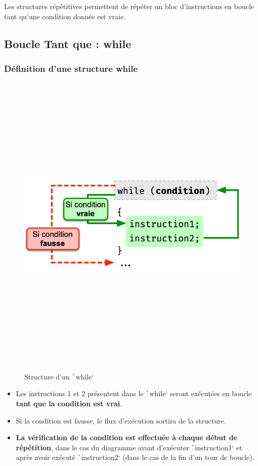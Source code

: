 \documentclass[10pt]{article}
\begin{document}
Les structures répétitives permettent de répéter un bloc d'instructions en boucle tant qu'une condition donnée est vraie.

\subsection{Boucle Tant que : while}
\subsubsection{Définition d'une structure while}

\smallskip
\begin{multicols}{2}
\begin{figure}[H]
    \includegraphics[max height=15cm,max width = \textwidth/2]{assets/while.jpg}
    \centering
    \caption{Structure d'un \texttt`while`}
\end{figure}

\begin{itemize}
    \item Les instructions 1 et 2 présentent dans le \texttt`while` seront exécutées en boucle \textbf{tant que la condition est vrai}.
    \item Si la condition est fausse, le flux d'exécution sortira de la structure.
    \item \textbf{La vérification de la condition est effectuée à chaque début de répétition}, dans le cas du diagramme avant d'exécuter \texttt`instruction1` et après avoir exécuté \texttt`instruction2` (dans le cas de la fin d'un tour de boucle).
\end{itemize}
\end{multicols}
\end{document}
